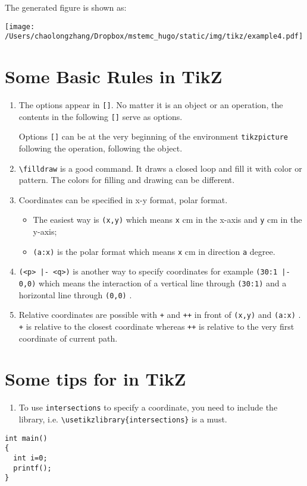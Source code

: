 \documentclass[koma,utopia,a4paper,captions=tableheading,11pt,listings-sv,microtype,paralist,colorlinks=true,urlcolor=blue]{org-article}
\begin{document}
The generated figure is shown as:
\begin{center}
\texttt{[image: /Users/chaolongzhang/Dropbox/mstemc\_hugo/static/img/tikz/example4.pdf]}
\end{center}


\section{Some Basic Rules in TikZ}
\label{sec:org171b856}


\begin{enumerate}
\item The options appear in \texttt{[]}. No matter it is an object or an operation, the
contents in the following  \texttt{[]} serve as options.

Options \texttt{[]} can be at the very beginning of the environment \texttt{tikzpicture}
following the operation, following the object.

\item \texttt{\textbackslash{}filldraw} is a good command. It draws a closed loop and fill it with color or
pattern. The colors for filling and drawing can be different.

\item Coordinates can be specified in x-y format, polar format.
\begin{itemize}
\item The easiest way is \texttt{(x,y)} which means \texttt{x} cm in the x-axis and \texttt{y} cm in the
y-axis;
\item \texttt{(a:x)} is the polar format which means \texttt{x} cm in direction \texttt{a} degree.
\end{itemize}
\item \texttt{(<p> |- <q>)} is another way to specify coordinates for example \texttt{(30:1 |- 0,0)}
which means the interaction of a vertical line through \texttt{(30:1)} and a
horizontal line through \texttt{(0,0)} .
\item Relative coordinates are possible with \texttt{+} and \texttt{++} in front of \texttt{(x,y)} and \texttt{(a:x)} .
\texttt{+} is relative to the closest coordinate whereas \texttt{++} is relative to the very
first coordinate of current path.
\end{enumerate}

\section{Some tips for in TikZ}
\label{sec:org46592f8}


\begin{enumerate}
\item To use \texttt{intersections} to specify a coordinate, you need to include the
library, i.e. \texttt{\textbackslash{}usetikzlibrary\{intersections\}} is a must.
\end{enumerate}


\lstset{language=C,label= ,caption= ,captionpos=b,firstnumber=1,numbers=left}
\begin{lstlisting}
int main()
{
  int i=0;
  printf();
}
\end{lstlisting}



\end{document}
